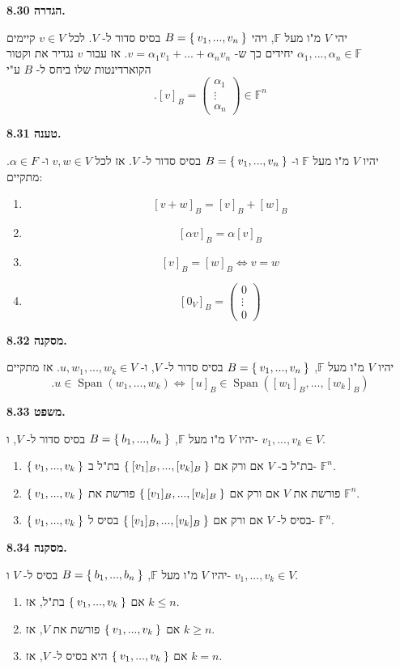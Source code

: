 \documentclass[12pt]{report}
\theoremstyle{plain}
\theoremstyle{definition}
\newcommand{\F}{\mathbb{F}}
\newcommand{\0}{\mathbf{0}}
\DeclareMathOperator{\Span}{Span}
\begin{document}
\noindent\textbf{הגדרה 8.30.}

יהי 
$V$
מ"ו מעל
$\F$,
ויהי
$B=\Set{v_1,...,v_n}$
בסיס סדור ל-
$V$.
לכל 
$v\in V$
קיימים
$\alpha_1,...,\alpha_n\in\F$
יחידים כך ש-
$v=\alpha_1v_1+...+\alpha_nv_n$.
אז עבור 
$v$
נגדיר את וקטור הקוארדינטות שלו ביחס
ל-
$B$
ע"י
$$
.[v]_B=\begin{pmatrix}
\alpha_1 \\
\vdots \\
\alpha_n
\end{pmatrix}\in\F^n
$$
\bigskip
\bigskip

\noindent\textbf{טענה 8.31.}

יהיו
$V$
מ"ו מעל
$\F$
ו-
$B=\Set{v_1,...,v_n}$
בסיס סדור ל-
$V$.
אז לכל
$v,w\in V$
ו-
$\alpha\in F$.
מתקיים:
\begin{enumerate}[label=\alph*.]
\item 
$$[v+w]_B=[v]_B+[w]_B$$
\item 
$$[\alpha v]_B=\alpha [v]_B$$
\item 
$$[v]_B=[w]_B \iff v=w$$
\item 
$$
[0_V]_B=\begin{pmatrix}
0 \\
\vdots \\
0
\end{pmatrix}
$$    
\end{enumerate}
\bigskip
\bigskip

\noindent\textbf{מסקנה 8.32.}

יהיו
$V$
מ"ו מעל
$\F$,
$B=\Set{v_1,...,v_n}$
בסיס סדור ל-
$V$,
ו-
$u,w_1,...,w_k\in V$.
אז מתקיים
$$
.u\in\Span(w_1,...,w_k) \iff [u]_B\in\Span([w_1]_B,...,[w_k]_B)
$$
\bigskip
\bigskip

\noindent\textbf{משפט 8.33.}

יהיו
$V$
מ"ו מעל
$\F$,
$B=\Set{b_1,...,b_n}$
בסיס סדור ל-
$V$,
ו-
$v_1,...,v_k\in V$.
\begin{enumerate}[label=\alph*.]
\item
$\Set{v_1,...,v_k}$
בת"ל ב-
$V$
אם ורק אם
$\Set{[v_1]_B,...,[v_k]_B}$
בת"ל ב-
$\F^n$.
\item 
$\Set{v_1,...,v_k}$
פורשת את
$V$
אם ורק אם
$\Set{[v_1]_B,...,[v_k]_B}$
פורשת את
$\F^n$.
\item 
$\Set{v_1,...,v_k}$
בסיס ל-
$V$
אם ורק אם
$\Set{[v_1]_B,...,[v_k]_B}$
בסיס ל-
$\F^n$.
\end{enumerate}
\bigskip
\bigskip

\noindent\textbf{מסקנה 8.34.}

יהיו
$V$
מ"ו מעל
$\F$,
$B=\Set{b_1,...,b_n}$
בסיס ל-
$V$
ו-
$v_1,...,v_k\in V$.
\begin{enumerate}[label=\alph*.]
\item 
אם 
$\Set{v_1,...,v_k}$
בת"ל, אז
$k\leq n$.
\item 
אם
$\Set{v_1,...,v_k}$
פורשת את
$V$,
אז
$k\geq n$.
\item
אם
$\Set{v_1,...,v_k}$
היא בסיס ל-
$V$,
אז
$k=n$.
\end{enumerate}
\bigskip
\bigskip
\end{document}
